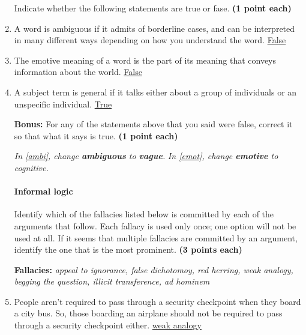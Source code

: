 \documentclass[10pt]{article}
\begin{document}
\begin{enumerate}
Indicate whether the following statements are true or fase. \textbf{(1 point each)}


\item A word is ambiguous if it admits of borderline cases, and can be interpreted in many different ways depending on how you understand the word. \underline{  False  }\label{ambi}

\item The emotive meaning of a word is the part of its meaning that conveys information about the world. \underline{  False  }\label{emot}

\item A subject term is general if it talks either about a group of individuals or an unspecific individual. \underline{  True  }


\textbf{Bonus:} For any of the statements above that you said were false, correct it so that what it says is true. \textbf{(1 point each)}

\vspace{2mm}
\textit{In \ref{ambi}, change \textbf{ambiguous} to \textbf{vague}.}
\textit{In \ref{emot}, change \textbf{emotive} to \textit{cognitive}.}
\vspace{2mm}

\paragraph{Informal logic}

Identify which of the fallacies listed below is committed by each of the arguments that follow. Each fallacy is used only once; one option will not be used at all. If it seems that multiple fallacies are committed by an argument, identify the one that is the most prominent. \textbf{(3 points each)}

\begin{center}\textbf{Fallacies:} \textit{appeal to ignorance, false dichotomoy, red herring, weak analogy, begging the question, illicit transference, ad hominem} \end{center}


\item People aren't required to pass through a security checkpoint when they board a city bus. So, those boarding an airplane should not be required to pass through a security checkpoint either. \underline{  weak analogy  }


\end{enumerate}
\end{document}
